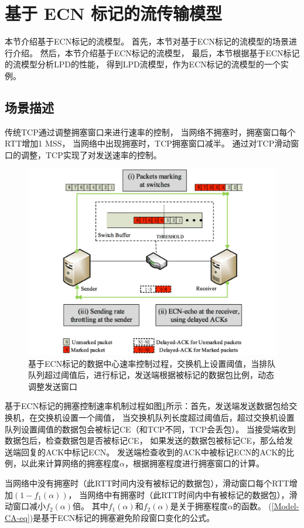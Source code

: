  \section{基于 ECN 标记的流传输模型}
本节介绍基于ECN标记的流模型。
首先，本节对基于ECN标记的流模型的场景进行介绍。
然后，本节介绍基于ECN标记的流模型，
最后，本节根据基于ECN标记的流模型分析LPD的性能，
得到LPD流模型，作为ECN标记的流模型的一个实例。

\subsection{场景描述}
传统TCP通过调整拥塞窗口来进行速率的控制，
当网络不拥塞时，拥塞窗口每个RTT增加1 MSS，
当网络中出现拥塞时，TCP拥塞窗口减半。
通过对TCP滑动窗口的调整，TCP实现了对发送速率的控制。

\begin{figure}[H] 
  \centering
  \includegraphics[width=0.9\columnwidth]{figures/others/model-process.pdf}
  \caption{基于ECN标记的数据中心速率控制过程，交换机上设置阈值，当排队队列超过阈值后，进行标记，发送端根据被标记的数据包比例，动态调整发送窗口}
  \label{model-process-fig}
\end{figure}

基于ECN标记的拥塞控制速率机制过程如图\ref{model-process-fig}所示：首先，发送端发送数据包给交换机，在交换机设置一个阈值，
当交换机队列长度超过阈值后，超过交换机设置队列设置阈值的数据包会被标记CE（和TCP不同，TCP会丢包）。
当接受端收到数据包后，检查数据包是否被标记CE，
如果发送的数据包被标记CE，那么给发送端回复的ACK中标记ECN。
发送端检查收到的ACK中被标记ECN的ACK的比例，以此来计算网络的拥塞程度$\alpha$，根据拥塞程度进行拥塞窗口的计算。

当网络中没有拥塞时（此RTT时间内没有被标记的数据包），滑动窗口每个RTT增加$(1-f_1(\alpha))$，
当网络中有拥塞时（此RTT时间内中有被标记的数据包），滑动窗口减小$f_2(\alpha)$倍。
其中$f_1(\alpha)$和$f_2(\alpha)$是关于拥塞程度$\alpha$的函数。
(\ref{Model-CA-eq})是基于ECN标记的拥塞避免阶段窗口变化的公式。


